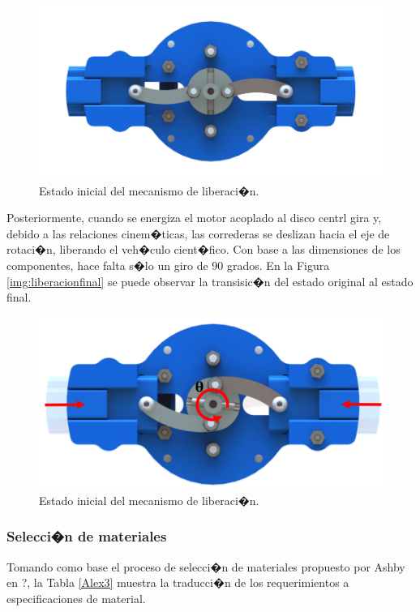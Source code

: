 \documentclass[10pt,a4paper]{book}
\begin{document}
\begin{figure}[H]
\begin{center}
\includegraphics[scale=0.35]{Imagenes/Liberacionorigen.png}  
\caption{Estado inicial del mecanismo de liberaci�n.}
\label{img:liberacioninicial}
\end{center}
\end{figure}
Posteriormente, cuando se energiza el motor acoplado al disco centrl gira y, debido a las relaciones cinem�ticas, las correderas se deslizan hacia el eje de rotaci�n, liberando el veh�culo cient�fico. Con base a las dimensiones de los componentes, hace falta s�lo un giro de 90 grados. En la Figura \ref{img:liberacionfinal} se puede observar la transisic�n del estado original al estado final.

\begin{figure}[H]
\begin{center}
\includegraphics[scale=0.30]{Imagenes/Liberacionfinal.png}  
\caption{Estado inicial del mecanismo de liberaci�n.}
\label{img:liberacioninicial}
\end{center}
\end{figure}


\subsubsection*{Selecci�n de materiales}
Tomando como base el proceso de selecci�n de materiales propuesto por Ashby en \cite{}?, la Tabla \ref{Alex3} muestra la traducci�n de los requerimientos a especificaciones de material.
\end{document}
